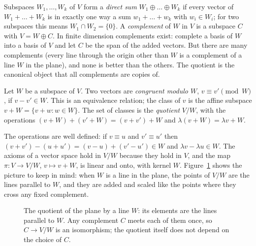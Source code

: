 Subspaces $W_1,\dots,W_k$ of $V$ form a \emph{direct sum} $W_1\oplus\dots\oplus W_k$ if every vector of $W_1+\dots+W_k$ is
in exactly one way a sum $w_1+\dots+w_k$ with $w_i\in W_i$; for two subspaces this means $W_1\cap W_2=\{0\}$. A
\emph{complement} of $W$ in $V$ is a subspace $C$ with $V=W\oplus C$. In finite dimension complements exist: complete a
basis of $W$ into a basis of $V$ and let $C$ be the span of the added vectors. But there are many complements (every
line through the origin other than $W$ is a complement of a line $W$ in the plane), and none is better than the others.
The quotient is the canonical object that all complements are copies of.

\begin{definition}\label{def:quotient}
Let $W$ be a subspace of $V$. Two vectors are \emph{congruent modulo $W$}, $v\equiv v'\pmod W$, if $v-v'\in W$. This is
an equivalence relation; the class of $v$ is the affine subspace $v+W=\{v+w:w\in W\}$. The set of classes is the
\emph{quotient} $V/W$, with the operations $(v+W)+(v'+W)=(v+v')+W$ and $\lambda(v+W)=\lambda v+W$.
\end{definition}

The operations are well defined: if $v\equiv u$ and $v'\equiv u'$ then $(v+v')-(u+u')=(v-u)+(v'-u')\in W$ and
$\lambda v-\lambda u\in W$. The axioms of a vector space hold in $V/W$ because they hold in $V$, and the map
$\pi:V\to V/W$, $v\mapsto v+W$, is linear and onto, with kernel $W$. Figure~\ref{fig:quotient} shows the picture to keep
in mind: when $W$ is a line in the plane, the points of $V/W$ are the lines parallel to $W$, and they are added and
scaled like the points where they cross any fixed complement.

\begin{figure}[ht]
\centering
{}
\caption{The quotient of the plane by a line $W$: its elements are the lines parallel to $W$. Any complement $C$ meets
each of them once, so $C\to V/W$ is an isomorphism; the quotient itself does not depend on the choice of $C$.}
\label{fig:quotient}
\end{figure}

